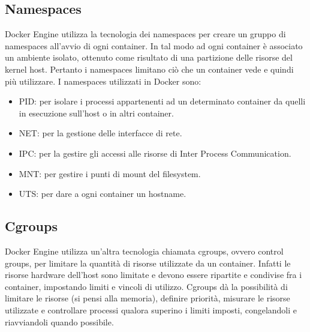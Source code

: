\subsection{Namespaces}
Docker Engine utilizza la tecnologia dei namespaces per creare un gruppo di namespaces all'avvio di ogni container. In tal modo ad ogni container è associato un ambiente isolato, ottenuto come risultato di una partizione delle risorse del kernel host. Pertanto i namespaces limitano ciò che un container vede e quindi più utilizzare. I namespaces utilizzati in Docker sono:
\begin{itemize}
    \item PID: per isolare i processi appartenenti ad un determinato container da quelli in esecuzione sull'host o in altri container.
    \item NET: per la gestione delle interfacce di rete.
    \item IPC: per la gestire gli accessi alle risorse di Inter Process Communication.
    \item MNT: per gestire i punti di mount del filesystem.
    \item UTS: per dare a ogni container un hostname.
\end{itemize}

\subsection{Cgroups}
Docker Engine utilizza un'altra tecnologia chiamata cgroups, ovvero control groups, per limitare la quantità di risorse utilizzate da un container. Infatti le risorse hardware dell'host sono limitate e devono essere ripartite e condivise fra i container, impostando limiti e vincoli di utilizzo. Cgroups dà la possibilità di limitare le risorse (si pensi alla memoria), definire priorità, misurare le risorse utilizzate e controllare processi qualora superino i limiti imposti, congelandoli e riavviandoli quando possibile.

